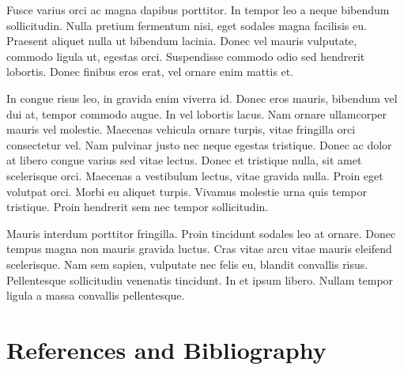 \documentclass{article}
\begin{document}
Fusce varius orci ac magna dapibus porttitor. In tempor leo a neque bibendum sollicitudin. Nulla pretium fermentum nisi, eget sodales magna facilisis eu. Praesent aliquet nulla ut bibendum lacinia. Donec vel mauris vulputate, commodo ligula ut, egestas orci. Suspendisse commodo odio sed hendrerit lobortis. Donec finibus eros erat, vel ornare enim mattis et.

\begin{question}
	In congue risus leo, in gravida enim viverra id. Donec eros mauris, bibendum vel dui at, tempor commodo augue. In vel lobortis lacus. Nam ornare ullamcorper mauris vel molestie. Maecenas vehicula ornare turpis, vitae fringilla orci consectetur vel. Nam pulvinar justo nec neque egestas tristique. Donec ac dolor at libero congue varius sed vitae lectus. Donec et tristique nulla, sit amet scelerisque orci. Maecenas a vestibulum lectus, vitae gravida nulla. Proin eget volutpat orci. Morbi eu aliquet turpis. Vivamus molestie urna quis tempor tristique. Proin hendrerit sem nec tempor sollicitudin.
\end{question}

Mauris interdum porttitor fringilla. Proin tincidunt sodales leo at ornare. Donec tempus magna non mauris gravida luctus. Cras vitae arcu vitae mauris eleifend scelerisque. Nam sem sapien, vulputate nec felis eu, blandit convallis risus. Pellentesque sollicitudin venenatis tincidunt. In et ipsum libero. Nullam tempor ligula a massa convallis pellentesque.



\section{References and Bibliography}
\printbibliography[heading=none]
\end{document}
